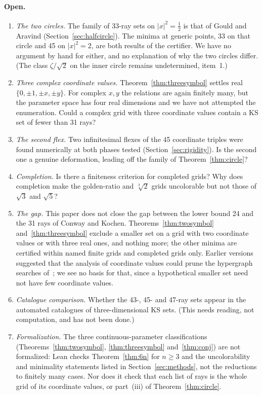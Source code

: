 \paragraph{Open.}
\begin{enumerate}[resume]
\item \emph{The two circles.}  The family of 33-ray sets on $|x|^2=\tfrac12$ is that of Gould
and Aravind (Section~\ref{sec:halfcircle}).  The minima at generic points, 33 on that circle and
45 on $|x|^2=2$, are both results of the certifier.  We have no argument by hand for either, and
no explanation of why the two circles differ.  (The class $\zeta/\sqrt2$ on the inner circle
remains undetermined, item~1.)
\item \emph{Three complex coordinate values.}  Theorem~\ref{thm:threesymbol} settles real
$\{0,\pm1,\pm x,\pm y\}$.  For complex $x,y$ the relations are again finitely many, but the
parameter space has four real dimensions and we have not attempted the enumeration.  Could a
complex grid with three coordinate values contain a KS set of fewer than 31 rays?
\item \emph{The second flex.}  Two infinitesimal flexes of the 45 coordinate triples were found numerically
at both phases tested (Section~\ref{sec:rigidity}).  Is the second one a genuine deformation, leading off the
family of Theorem~\ref{thm:circle}?
\item \emph{Completion.}  Is there a finiteness criterion for completed grids?  Why does
completion make the golden-ratio and $\sqrt[3]2$ grids uncolorable but not those of $\sqrt3$ and
$\sqrt5$?
\item \emph{The gap.}  This paper does not close the gap between the lower bound 24 and
the 31 rays of Conway and Kochen.  Theorems~\ref{thm:twosymbol} and~\ref{thm:threesymbol} exclude a
smaller set on a grid with two coordinate values or with three real ones, and nothing more; the other minima are certified within named finite grids and completed grids
only.  Earlier
versions suggested that the analysis of coordinate values could prune the hypergraph searches
of~\cite{LiBrightGanesh2024,KirchwegerPeitlSzeider2023}; we see no basis for that, since a
hypothetical smaller set need not have few coordinate values.
\item \emph{Catalogue comparison.}  Whether the 43-, 45- and 47-ray sets appear in the automated
catalogues of three-dimensional KS sets.  (This needs reading, not computation, and has not been
done.)
\item \emph{Formalization.}  The three continuous-parameter classifications
(Theorems~\ref{thm:twosymbol}, \ref{thm:threesymbol} and~\ref{thm:conj}) are not formalized:
Lean checks Theorem~\ref{thm:6n} for $n\ge3$ and the uncolorability and minimality statements
listed in Section~\ref{sec:methods}, not the reductions to finitely many cases.  Nor does it check that each list of rays is the whole grid of its coordinate values, or
part~(iii) of Theorem~\ref{thm:circle}.
\end{enumerate}

